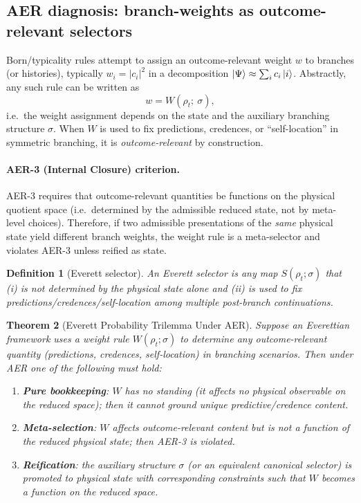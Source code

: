 \documentclass[11pt]{article}
\newtheorem{definition}{Definition}[section]
\newtheorem{theorem}[definition]{Theorem}
\theoremstyle{remark}
\theoremstyle{plain}
\begin{document}
\subsection{AER diagnosis: branch-weights as outcome-relevant selectors}

Born/typicality rules attempt to assign an outcome-relevant weight $w$ to branches (or histories),
typically $w_i = |c_i|^2$ in a decomposition $\ket{\Psi}\approx \sum_i c_i \ket{i}$.
Abstractly, any such rule can be written as
\begin{equation}
w = W(\rho_t;\ \sigma),
\end{equation}
i.e.\ the weight assignment depends on the state and the auxiliary branching structure $\sigma$.
When $W$ is used to fix predictions, credences, or ``self-location'' in symmetric branching,
it is \emph{outcome-relevant} by construction.

\paragraph{AER-3 (Internal Closure) criterion.}
AER-3 requires that outcome-relevant quantities be functions on the physical quotient space
(i.e.\ determined by the admissible reduced state, not by meta-level choices).
Therefore, if two admissible presentations of the \emph{same} physical state yield different
branch weights, the weight rule is a meta-selector and violates AER-3 unless reified as state.

\begin{definition}[Everett selector]
An Everett selector is any map $S(\rho_t;\sigma)$ that (i) is not determined by the physical state alone
and (ii) is used to fix predictions/credences/self-location among multiple post-branch continuations.
\end{definition}

\begin{theorem}[Everett Probability Trilemma Under AER]
\label{thm:everett-trilemma}
Suppose an Everettian framework uses a weight rule $W(\rho_t;\sigma)$ to determine any outcome-relevant quantity
(predictions, credences, self-location) in branching scenarios. Then under AER one of the following must hold:

\begin{enumerate}
\item \textbf{Pure bookkeeping}: $W$ has no standing (it affects no physical observable on the reduced space);
then it cannot ground unique predictive/credence content.
\item \textbf{Meta-selection}: $W$ affects outcome-relevant content but is not a function of the reduced physical state;
then AER-3 is violated.
\item \textbf{Reification}: the auxiliary structure $\sigma$ (or an equivalent canonical selector) is promoted to physical state
with corresponding constraints such that $W$ becomes a function on the reduced space.
\end{enumerate}
\end{theorem}
\end{document}
